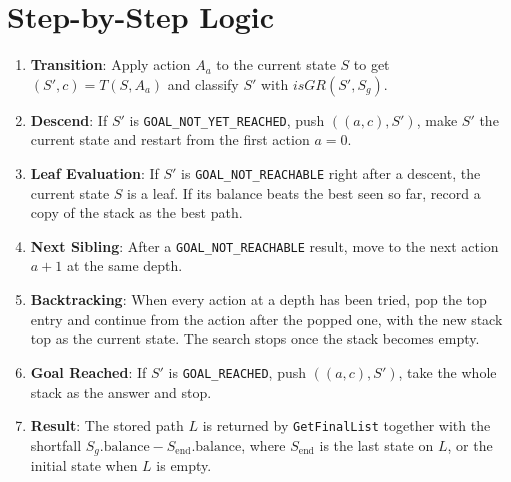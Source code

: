 \documentclass[11pt,a4paper]{article}
\begin{document}
\section{Step-by-Step Logic}
\begin{enumerate}\itemsep 0pt \parskip 0pt
    \item \textbf{Transition}: Apply action $A_a$ to the current state $S$ to
          get $(S', c) = T(S, A_a)$ and classify $S'$ with
          $\mathit{isGR}(S', S_g)$.
    \item \textbf{Descend}: If $S'$ is \texttt{GOAL\_NOT\_YET\_REACHED}, push
          $((a, c), S')$, make $S'$ the current state and restart from the
          first action $a = 0$.
    \item \textbf{Leaf Evaluation}: If $S'$ is \texttt{GOAL\_NOT\_REACHABLE}
          right after a descent, the current state $S$ is a leaf. If its
          balance beats the best seen so far, record a copy of the stack as
          the best path.
    \item \textbf{Next Sibling}: After a \texttt{GOAL\_NOT\_REACHABLE} result,
          move to the next action $a + 1$ at the same depth.
    \item \textbf{Backtracking}: When every action at a depth has been tried,
          pop the top entry and continue from the action after the popped
          one, with the new stack top as the current state. The search stops
          once the stack becomes empty.
    \item \textbf{Goal Reached}: If $S'$ is \texttt{GOAL\_REACHED}, push
          $((a, c), S')$, take the whole stack as the answer and stop.
    \item \textbf{Result}: The stored path $L$ is returned by
          \texttt{GetFinalList} together with the shortfall
          $S_g.\text{balance} - S_{\text{end}}.\text{balance}$, where
          $S_{\text{end}}$ is the last state on $L$, or the initial state when
          $L$ is empty.
\end{enumerate}

\clearpage
\endgroup

\begingroup
{}
\hypersetup{
    colorlinks=true,
    linkcolor=secondary,
    urlcolor=secondary
}
\pagestyle{fancy}
\fancyhf{}
\lhead{\textcolor{primary}{\bfseries Recurring Deposit Derivation}}
\cfoot{\thepage}
\end{document}
